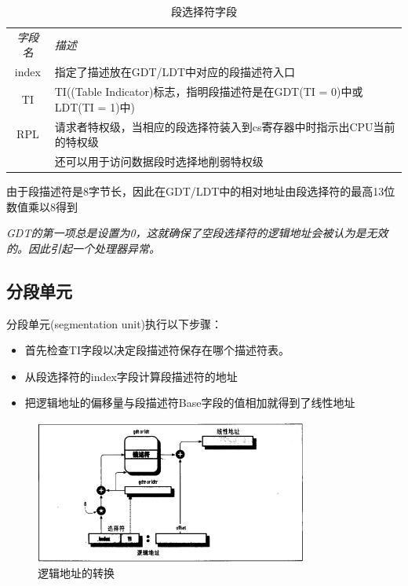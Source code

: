 \begin{table}[!htbp]
    \begin{center}
        \caption{段选择符字段}
        \begin{tabular}{c l}
            \hline
            \emph{字段名} & \emph{描述} \\
            index & 指定了描述放在GDT/LDT中对应的段描述符入口 \\
            TI & TI((Table Indicator)标志，指明段描述符是在GDT(TI = 0)中或LDT(TI = 1)中) \\
            RPL & 请求者特权级，当相应的段选择符装入到cs寄存器中时指示出CPU当前的特权级 \\
            & 还可以用于访问数据段时选择地削弱特权级 \\
            \hline
        \end{tabular}
    \end{center}
\end{table}

    由于段描述符是8字节长，因此在GDT/LDT中的相对地址由段选择符的最高13位数值乘以8得到

    \emph{GDT的第一项总是设置为0，这就确保了空段选择符的逻辑地址会被认为是无效的。因此引起一个处理器异常。}

\subsection{分段单元}

    分段单元(segmentation unit)执行以下步骤：

\begin{itemize}
    \item 首先检查TI字段以决定段描述符保存在哪个描述符表。
    \item 从段选择符的index字段计算段描述符的地址
    \item 把逻辑地址的偏移量与段描述符Base字段的值相加就得到了线性地址
\end{itemize}

\begin{figure}[!htbp]
    \centering
    \includegraphics[width=0.8\textwidth]{image/chapter02/逻辑地址的转换.png}
    \caption{逻辑地址的转换}
\end{figure}


